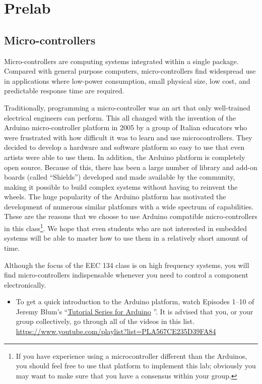 \documentclass[letterpaper, 11pt]{article}
\begin{document}
\newpage
\section{Prelab}
\subsection{Micro-controllers}
Micro-controllers are computing systems integrated within a single package. Compared with general purpose computers, micro-controllers find widespread use in applications where low-power consumption, small physical size, low cost, and predictable response time are required. 

Traditionally, programming a micro-controller was an art that only well-trained electrical engineers can perform. This all changed with the invention of the Arduino micro-controller platform in 2005 by a group of Italian educators who were frustrated with how difficult it was to learn and use microcontrollers. They decided to develop a hardware and software platform so easy to use that even artists were able to use them. In addition, the Arduino platform is completely open source. Because of this, there has been a large number of library and add-on boards (called ``Shields'') developed and made available by the community, making it possible to build complex systems without having to reinvent the wheels. The huge popularity of the Arduino platform has motivated the development of numerous similar platfomrs with a wide spectrum of capabilities. These are the reasons that we choose to use Arduino compatible micro-controllers in this class\footnote{If you have experience using a microcontroller different than the Arduinos, you should feel free to use that platform to implement this lab; obviously you may want to make sure that you have a consensus within your group.}. We hope that even students who are not interested in embedded systems will be able to master how to use them in a relatively short amount of time. 

Although the focus of the EEC 134 class is on high frequency systems, you will find micro-controllers indispensable whenever you need to control a component electronically.  

\begin{itemize}[itemsep=0.1ex]
	\item To get a quick introduction to the Arduino platform, watch Episodes 1--10 of Jeremy Blum’s ``\href{https://www.youtube.com/playlist?list=PLA567CE235D39FA84}{Tutorial Series for Arduino} ''. It is advised that you, or your group collectively, go through all of the videos in this list. 	\url{https://www.youtube.com/playlist?list=PLA567CE235D39FA84}
	
\end{itemize}
\end{document}
